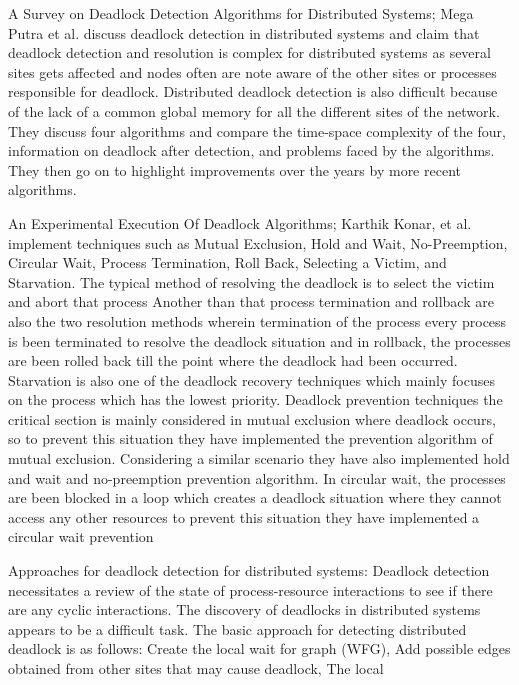\documentclass[sigplan,screen]{acmart}
\begin{document}
\par
A Survey on Deadlock Detection Algorithms for Distributed Systems; Mega Putra et al. discuss deadlock detection in distributed systems and claim that deadlock detection and resolution is complex for distributed systems as several sites gets affected and nodes often are note aware of the other sites or processes responsible for deadlock. Distributed deadlock detection is also difficult because of the lack of a common global memory for all the different sites of the network. They discuss four algorithms and compare the time-space complexity of the four, information on deadlock after detection, and problems faced by the algorithms. They then go on to highlight improvements over the years by more recent algorithms.
\par
An Experimental Execution Of Deadlock Algorithms; Karthik Konar, et al. implement techniques such as Mutual Exclusion, Hold and Wait, No-Preemption, Circular Wait, Process Termination, Roll Back, Selecting a Victim, and Starvation. The typical method of resolving the deadlock is to select the victim and abort that process Another than that process termination and rollback are also the two resolution methods wherein termination of the process every process is been terminated to resolve the deadlock situation and in rollback, the processes are been rolled back till the point where the deadlock had been occurred. Starvation is also one of the deadlock recovery techniques which mainly focuses on the process which has the lowest priority. Deadlock prevention techniques the critical section is mainly considered in mutual exclusion where deadlock occurs, so to prevent this situation they have implemented the prevention algorithm of mutual exclusion. Considering a similar scenario they have also implemented hold and wait and no-preemption prevention algorithm. In circular wait, the processes are been blocked in a loop which creates a deadlock situation where they cannot access any other resources to prevent this situation they have implemented a circular wait prevention 
\par
Approaches for deadlock detection for distributed systems:
Deadlock detection necessitates a review of the state of process-resource interactions to see if there are any cyclic interactions.
The discovery of deadlocks in distributed systems appears to be a difficult task.
The basic approach for detecting distributed deadlock is as follows:
Create the local wait for graph (WFG), Add possible edges
obtained from other sites that may cause deadlock, The local
\end{document}
